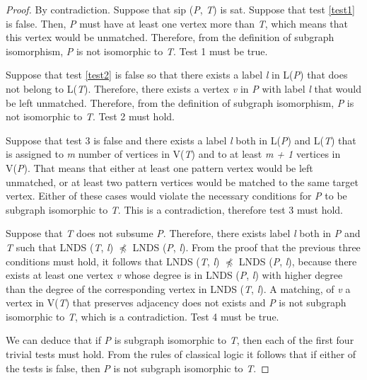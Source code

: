 \documentclass{l4proj}
\begin{document}
\begin{proof}
By contradiction. Suppose that \gls{sip} (\emph{P}, \emph{T}) is \gls{sat}.
Suppose that test \ref{test1} is false. Then, \emph{P} must have at least one vertex more than \emph{T}, which means that this vertex would be unmatched. Therefore, from the definition of subgraph isomorphism, \emph{P} is not isomorphic to \emph{T}. Test 1 must be true.

Suppose that test \ref{test2} is false so that there exists a label \emph{l} in L(\emph{P}) that does not belong to L(\emph{T}). Therefore, there exists a vertex \emph{v} in \emph{P} with label \emph{l} that would be left unmatched.  Therefore, from the definition of subgraph isomorphism, \emph{P} is not isomorphic to \emph{T}. Test 2 must hold.

Suppose that test 3 is false and there exists a label \emph{l} both in L(\emph{P}) and L(\emph{T}) that is assigned to \emph{m} number of vertices in V(\emph{T}) and to at least \emph{m + 1} vertices in V(\emph{P}). That means that either at least one pattern vertex would be left unmatched, or at least two pattern vertices would be matched to the same target vertex. Either of these cases would violate the necessary conditions for \emph{P} to be subgraph isomorphic to \emph{T}. This is a contradiction, therefore test 3 must hold.

Suppose that \emph{T} does not subsume \emph{P}. Therefore, there exists label \emph{l} both in \emph{P} and \emph{T} such that LNDS (\emph{T}, \emph{l}) $\npreceq$ LNDS (\emph{P}, \emph{l}). From the proof that the previous three conditions must hold, it follows that LNDS (\emph{T}, \emph{l}) $\npreceq$ LNDS (\emph{P}, \emph{l}), because there exists at least one vertex \emph{v} whose degree is in LNDS (\emph{P}, \emph{l}) with higher degree than the degree of the corresponding vertex  in LNDS (\emph{T}, \emph{l}). A matching, of \emph{v} a vertex in V(\emph{T}) that preserves adjacency does not exists and \emph{P} is not subgraph isomorphic to \emph{T}, which is a contradiction. Test 4 must be true. 

We can deduce that if \emph{P} is subgraph isomorphic to \emph{T}, then each of the first four trivial tests must hold. From the rules of classical logic it follows that if either of the tests is false, then \emph{P} is not subgraph isomorphic to \emph{T}.
\end{proof}
\end{document}
